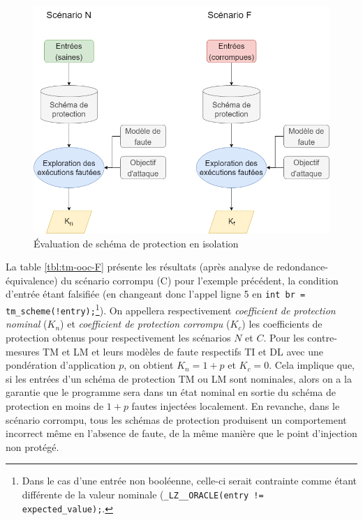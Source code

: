                 \begin{figure}[!htp]\centering
                    \includegraphics[scale=0.39]{ch5-placement/img/out-of-context-metho.png}
                    \caption{Évaluation de schéma de protection en isolation}
                    \label{fig:out-of-context}
                \end{figure}
        
                La table \ref{tbl:tm-ooc-F} présente les résultats (après analyse de redondance-équivalence) du scénario corrompu (C) pour l'exemple précédent, la condition d'entrée étant falsifiée (en changeant donc l'appel ligne 5 en \texttt{int br = tm\_scheme(!entry);}\footnote{Dans le cas d'une entrée non booléenne, celle-ci serait contrainte comme étant différente de la valeur nominale (\texttt{\_LZ\_\_ORACLE(entry != expected\_value);}.}). 
                On appellera respectivement \textit{coefficient de protection nominal} ($K_n$) et \textit{coefficient de protection corrompu} ($K_c$) les coefficients de protection obtenus pour respectivement les scénarios $N$ et $C$.
                Pour les contre-mesures \gls{TM} et \gls{LM} et leurs modèles de faute respectifs \gls{TI} et \gls{DL} avec une pondération d'application $p$, on obtient $K_n = 1 + p$ et $K_c = 0$. 
                Cela implique que, si les entrées d'un schéma de protection \gls{TM} ou \gls{LM} sont nominales, alors on a la garantie que le programme sera dans un état nominal en sortie du schéma de protection en moins de $1 + p$ fautes injectées localement. 
                En revanche, dans le scénario corrompu, tous les schémas de protection produisent un comportement incorrect même en l'absence de faute, de la même manière que le point d'injection non protégé.
                
